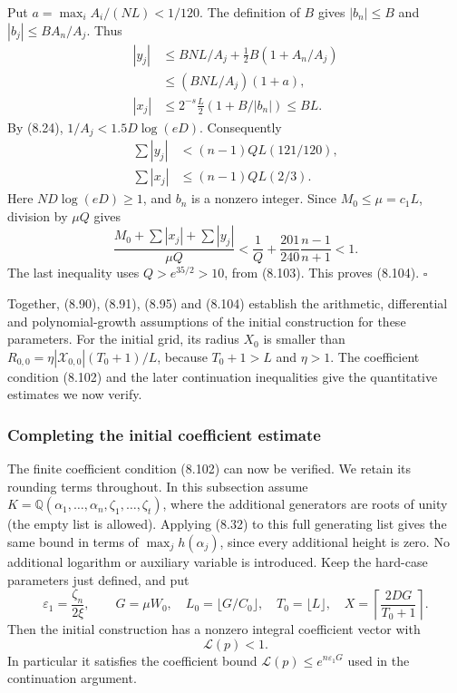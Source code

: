 \documentclass[
  11pt,
  a4paper,
]{article}
\begin{document}
Put \(a=\max_i A_i/(NL)<1/120\). The definition of \(B\) gives
\(|b_n|\le B\) and \(|b_j|\le BA_n/A_j\). Thus \[
\begin{aligned}
|y_j|
&\le BNL/A_j+\tfrac12B(1+A_n/A_j)\\
&\le (BNL/A_j)(1+a),\\
|x_j|
&\le 2^{-s}\frac L2(1+B/|b_n|)
\le BL.
\end{aligned}
\] By (8.24), \(1/A_j<1.5D\log(eD)\). Consequently \[
\begin{aligned}
\sum|y_j|&<(n-1)QL(121/120),\\
\sum|x_j|&\le(n-1)QL(2/3).
\end{aligned}
\] Here \(ND\log(eD)\ge1\), and \(b_n\) is a nonzero integer. Since
\(M_0\le\mu=c_1L\), division by \(\mu Q\) gives \[
\frac{M_0+\sum|x_j|+\sum|y_j|}{\mu Q}
<
\frac1Q+\frac{201}{240}\frac{n-1}{n+1}<1.
\] The last inequality uses \(Q>e^{35/2}>10\), from (8.103). This proves
(8.104). \(\square\)

Together, (8.90), (8.91), (8.95) and (8.104) establish the arithmetic,
differential and polynomial-growth assumptions of the initial
construction for these parameters. For the initial grid, its radius
\(X_0\) is smaller than \(R_{0,0}=\eta|\mathcal X_{0,0}|(T_0+1)/L\),
because \(T_0+1>L\) and \(\eta>1\). The coefficient condition (8.102)
and the later continuation inequalities give the quantitative estimates
we now verify.

\subsubsection{Completing the initial coefficient
estimate}\label{completing-the-initial-coefficient-estimate}

The finite coefficient condition (8.102) can now be verified. We retain
its rounding terms throughout. In this subsection assume
\(K=\mathbb Q(\alpha_1,\ldots,\alpha_n,\zeta_1,\ldots,\zeta_t)\), where
the additional generators are roots of unity (the empty list is
allowed). Applying (8.32) to this full generating list gives the same
bound in terms of \(\max_jh(\alpha_j)\), since every additional height
is zero. No additional logarithm or auxiliary variable is introduced.
Keep the hard-case parameters just defined, and put \[
\varepsilon_1=\frac{\zeta_n}{2\xi},\qquad
G=\mu W_0,\quad
L_0=\lfloor G/C_0\rfloor,\quad
T_0=\lfloor L\rfloor,\quad
X=\left\lceil\frac{2DG}{T_0+1}\right\rceil.
\] Then the initial construction has a nonzero integral coefficient
vector with \[
\mathcal L(p)<1.
\tag{8.105}
\] In particular it satisfies the coefficient bound
\(\mathcal L(p)\le e^{n\varepsilon_1G}\) used in the continuation
argument.
\end{document}
